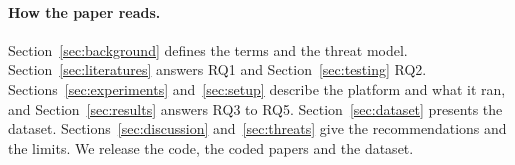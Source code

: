 \paragraph{How the paper reads.} Section~\ref{sec:background} defines the
terms and the threat model. Section~\ref{sec:literatures} answers RQ1 and
Section~\ref{sec:testing} RQ2. Sections~\ref{sec:experiments}
and~\ref{sec:setup} describe the platform and what it ran, and
Section~\ref{sec:results} answers RQ3 to RQ5. Section~\ref{sec:dataset}
presents the dataset. Sections~\ref{sec:discussion} and~\ref{sec:threats}
give the recommendations and the limits. We release the code, the coded
papers and the dataset.
